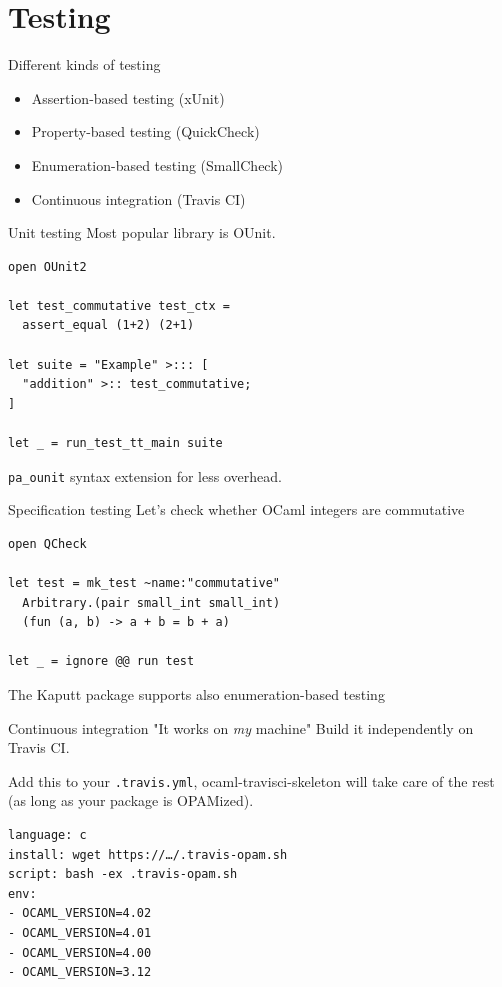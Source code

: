 \documentclass{beamer}
\begin{document}
\section{Testing}

\begin{frame}{Different kinds of testing}
  \begin{itemize}
    \item Assertion-based testing (xUnit)
    \item Property-based testing (QuickCheck)
    \item Enumeration-based testing (SmallCheck)
    \item Continuous integration (Travis CI)
  \end{itemize}
\end{frame}

\begin{frame}[fragile]{Unit testing}
  Most popular library is OUnit.
  \begin{verbatim}
open OUnit2

let test_commutative test_ctx =
  assert_equal (1+2) (2+1)

let suite = "Example" >::: [
  "addition" >:: test_commutative;
]

let _ = run_test_tt_main suite
  \end{verbatim}
  \texttt{pa\_ounit} syntax extension for less overhead.
\end{frame}

\begin{frame}[fragile]{Specification testing}
  Let's check whether OCaml integers are commutative
  \begin{verbatim}
open QCheck

let test = mk_test ~name:"commutative"
  Arbitrary.(pair small_int small_int)
  (fun (a, b) -> a + b = b + a)

let _ = ignore @@ run test
  \end{verbatim}
  The Kaputt package supports also enumeration-based testing
\end{frame}

\begin{frame}[fragile]{Continuous integration}
  "It works on \emph{my} machine" \pause Build it independently on Travis CI.

  Add this to your \texttt{.travis.yml}, ocaml-travisci-skeleton will take care of
  the rest (as long as your package is OPAMized).
  \begin{verbatim}
language: c
install: wget https://…/.travis-opam.sh
script: bash -ex .travis-opam.sh
env:
- OCAML_VERSION=4.02
- OCAML_VERSION=4.01
- OCAML_VERSION=4.00
- OCAML_VERSION=3.12
  \end{verbatim}
\end{frame}
\end{document}
